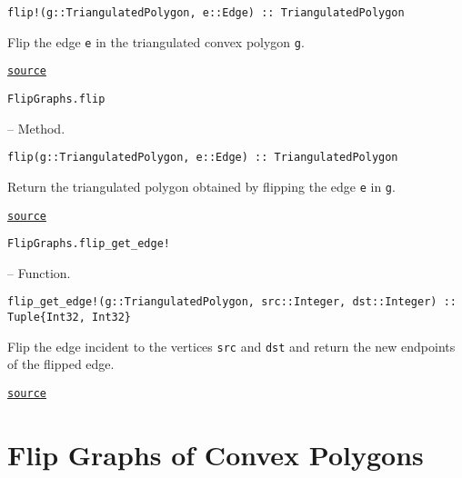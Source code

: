 \begin{adjustwidth}{2em}{0pt}


\begin{verbatim}
flip!(g::TriangulatedPolygon, e::Edge) :: TriangulatedPolygon
\end{verbatim}

Flip the edge \texttt{e} in the triangulated convex polygon \texttt{g}.



\href{https://github.com/schto223/FlipGraphs.jl/blob/e35d43698a06b86273148826b79d585ba04fcd26/src/polygonTriangulations.jl#L155-L159}{\texttt{source}}


\end{adjustwidth}
\hypertarget{475240096103298242}{\texttt{FlipGraphs.flip}}  -- {Method.}

\begin{adjustwidth}{2em}{0pt}


\begin{verbatim}
flip(g::TriangulatedPolygon, e::Edge) :: TriangulatedPolygon
\end{verbatim}

Return the triangulated polygon obtained by flipping the edge \texttt{e} in \texttt{g}.



\href{https://github.com/schto223/FlipGraphs.jl/blob/e35d43698a06b86273148826b79d585ba04fcd26/src/polygonTriangulations.jl#L148-L152}{\texttt{source}}


\end{adjustwidth}
\hypertarget{6564352418014428904}{\texttt{FlipGraphs.flip\_get\_edge!}}  -- {Function.}

\begin{adjustwidth}{2em}{0pt}


\begin{verbatim}
flip_get_edge!(g::TriangulatedPolygon, src::Integer, dst::Integer) :: Tuple{Int32, Int32}
\end{verbatim}

Flip the edge incident to the vertices \texttt{src} and \texttt{dst} and return the new endpoints of the flipped edge.



\href{https://github.com/schto223/FlipGraphs.jl/blob/e35d43698a06b86273148826b79d585ba04fcd26/src/polygonTriangulations.jl#L183-L187}{\texttt{source}}


\end{adjustwidth}

\chapter{Flip Graphs of Convex Polygons}



